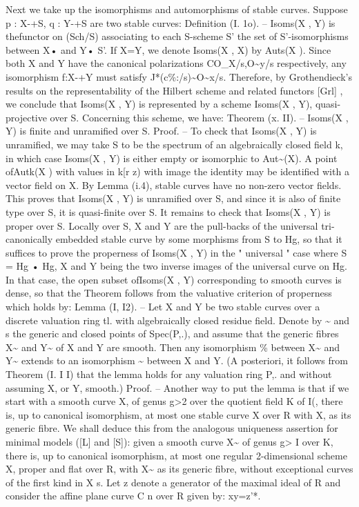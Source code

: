 \documentclass[11pt]{article}
\theoremstyle{plain}
\theoremstyle{definition}
\theoremstyle{remark}
\begin{document}
Next we take up the isomorphisms and automorphisms of stable curves. Suppose p : X-+S, q : Y-+S are two stable curves: Definition (I. 1o). -- Isoms(X , Y) is thefunctor on (Sch/S) associating to each S-scheme S' the set of S'-isomorphisms between X• and Y• S'. If X=Y, we denote Isoms(X , X) by Auts(X ). Since both X and Y have the canonical polarizations CO\_X/s,O\textasciitilde{}y/s respectively, any isomorphism f:X-+Y must satisfy J*(c\%:/s)\textasciitilde{}O\textasciitilde{}x/s. Therefore, by Grothendieck's results on the representability of the Hilbert scheme and related functors [Grl] , we conclude that Isoms(X , Y) is represented by a scheme Isoms(X , Y), quasi-projective over S. Concerning this scheme, we have: Theorem (x. II). -- Isoms(X , Y) is finite and unramified over S. Proof. -- To check that Isoms(X , Y) is unramified, we may take S to be the spectrum of an algebraically closed field k, in which case Isoms(X , Y) is either empty or isomorphic to Aut\textasciitilde{}(X). A point ofAutk(X ) with values in k[r z) with image the identity may be identified with a vector field on X. By Lemma (i.4), stable curves have no non-zero vector fields. This proves that Isoms(X , Y) is unramified over S, and since it is also of finite type over S, it is quasi-finite over S. It remains to check that Isoms(X , Y) is proper over S. Locally over S, X and Y are the pull-backs of the universal tri-canonically embedded stable curve by some morphisms from S to Hg, so that it suffices to prove the properness of Isoms(X , Y) in the " universal " case where S = Hg • Hg, X and Y being the two inverse images of the universal curve on Hg. In that case, the open subset ofIsoms(X , Y) corresponding to smooth curves is dense, so that the Theorem follows from the valuative criterion of properness which holds by: Lemma (I, I2). -- Let X and Y be two stable curves over a discrete valuation ring tl. with algebraically closed residue field. Denote by \textasciitilde{} and s the generic and closed points of Spec(P,.), and assume that the generic fibres X\textasciitilde{} and Y\textasciitilde{} of X and Y are smooth. Then any isomorphism \% between X\textasciitilde{} and Y\textasciitilde{} extends to an isomorphism \textasciitilde{} between X and Y. (A posteriori, it follows from Theorem (I. I I) that the lemma holds for any valuation ring P,. and without assuming X, or Y, smooth.) Proof. -- Another way to put the lemma is that if we start with a smooth curve X, of genus g>2 over the quotient field K of I(, there is, up to canonical isomorphism, at most one stable curve X over R with X, as its generic fibre. We shall deduce this from the analogous uniqueness assertion for minimal models ([L] and [S]): given a smooth curve X\textasciitilde{} of genus g> I over K, there is, up to canonical isomorphism, at most one regular 2-dimensional scheme X, proper and flat over R, with X\textasciitilde{} as its generic fibre, without exceptional curves of the first kind in X s. Let z denote a generator of the maximal ideal of R and consider the affine plane curve C n over R given by: xy=z'*.
\end{document}
